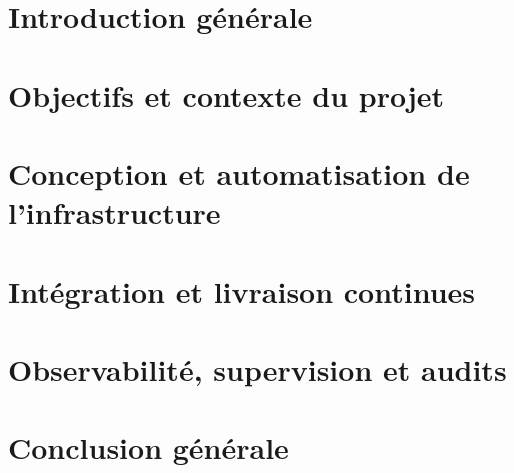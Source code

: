 \chapter{Introduction générale}


\chapter{Objectifs et contexte du projet}\label{chapter:objectifs_contexte}


\chapter{Conception et automatisation de l’infrastructure}\label{chapter:iac}


\chapter{Intégration et livraison continues}\label{chapter:cicd}


\chapter{Observabilité, supervision et audits}\label{chapter:observabilite_auditing}


\chapter{Conclusion générale}

